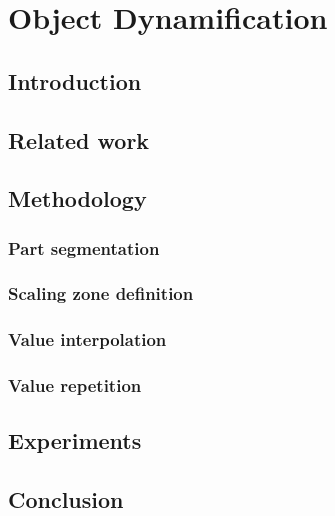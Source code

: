
\chapter{Object Dynamification} \label{ch:8_Object_Dynamification}

\section{Introduction}

\section{Related work}

\section{Methodology}

\subsection{Part segmentation}

\subsection{Scaling zone definition}

\subsection{Value interpolation}

\subsection{Value repetition}

\section{Experiments}

\section{Conclusion}

\cleardoublepage

